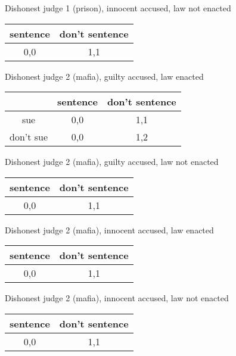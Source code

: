 \documentclass[a4paper, 12pt]{article}
\begin{document}
\begin{center}
  Dishonest judge 1 (prison), innocent accused, law not enacted
  \\
  \begin{tabular}{|c|c|}
	\hline
	sentence & don't sentence \\\hline
	0,0 & 1,1 \\\hline
  \end{tabular}
\end{center}

\begin{center}
  Dishonest judge 2 (mafia), guilty accused, law enacted
  \\
  \begin{tabular}{|c|c|c|}
	\hline
	& sentence & don't sentence \\\hline
	sue &  0,0 & 1,1 \\\hline
	don't sue & 0,0 & 1,2 \\\hline
  \end{tabular}
\end{center}

\begin{center}
  Dishonest judge 2 (mafia), guilty accused, law not enacted
  \\
  \begin{tabular}{|c|c|}
	\hline
	sentence & don't sentence \\\hline
	0,0 & 1,1 \\\hline
  \end{tabular}
\end{center}

\begin{center}
  Dishonest judge 2 (mafia), innocent accused, law enacted
  \\
  \begin{tabular}{|c|c|}
	\hline
	sentence & don't sentence \\\hline
	0,0 & 1,1 \\\hline
  \end{tabular}
\end{center}

\begin{center}
  Dishonest judge 2 (mafia), innocent accused, law not enacted
  \\
  \begin{tabular}{|c|c|}
	\hline
	sentence & don't sentence \\\hline
	0,0 & 1,1 \\\hline
  \end{tabular}
\end{center}
\end{document}
